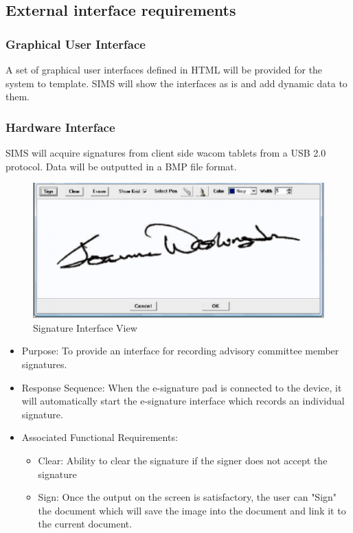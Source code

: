 \documentclass[11pt,a4paper]{report}
\begin{document}
\subsection{External interface requirements}
\subsubsection{Graphical User Interface}
A set of graphical user interfaces defined in HTML will be provided for the system to template. SIMS will show the interfaces as is and add dynamic data to them. 
\subsubsection{Hardware Interface}
SIMS will acquire signatures from client side wacom tablets from a USB 2.0 protocol. Data will be outputted in a BMP file format. 

\begin{figure}[htp]
\centering
\includegraphics[scale=0.75]{diagrams/HTMLTemplating/Figure6.png}
\caption{Signature Interface View}
\label{fig:signature}
\end{figure}

\begin{itemize}
\item Purpose: To provide an interface for recording advisory committee member signatures.
\item Response Sequence: When the e-signature pad is connected to the device, it will automatically start the e-signature interface which records an individual signature.
\item Associated Functional Requirements:
\begin{itemize}
\item Clear: Ability to clear the signature if the signer does not accept the signature
\item Sign: Once the output on the screen is satisfactory, the user can "Sign" the document which will save the image into the document and link it to the current document.
\end{itemize}
\end{itemize}
\end{document}
